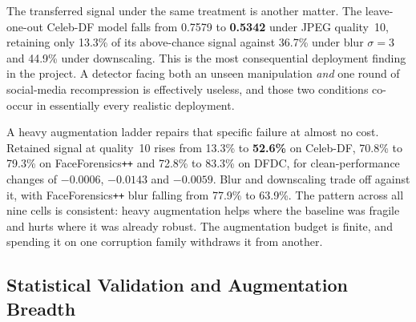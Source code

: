 \documentclass[journal,onecolumn]{IEEEtran}
\newcommand{\celebdf}{Celeb-DF}
\newcommand{\dfdc}{DFDC}
\begin{document}
The transferred signal under the same treatment is another matter. The
leave-one-out \celebdf{} model falls from 0.7579 to \textbf{0.5342} under JPEG
quality~10, retaining only 13.3\% of its above-chance signal against 36.7\% under
blur $\sigma=3$ and 44.9\% under downscaling. This is the most consequential
deployment finding in the project. A detector facing both an unseen manipulation
\emph{and} one round of social-media recompression is effectively useless, and
those two conditions co-occur in essentially every realistic deployment.

A heavy augmentation ladder repairs that specific failure at almost no cost.
Retained signal at quality~10 rises from 13.3\% to \textbf{52.6\%} on \celebdf{},
70.8\% to 79.3\% on FaceForensics\texttt{++} and 72.8\% to 83.3\% on \dfdc{}, for
clean-performance changes of $-0.0006$, $-0.0143$ and $-0.0059$. Blur and
downscaling trade off against it, with FaceForensics\texttt{++} blur falling from
77.9\% to 63.9\%. The pattern across all nine cells is consistent: heavy
augmentation helps where the baseline was fragile and hurts where it was already
robust. The augmentation budget is finite, and spending it on one corruption family
withdraws it from another.

\subsection{Statistical Validation and Augmentation Breadth}
\label{ssec:breadth}
\end{document}
